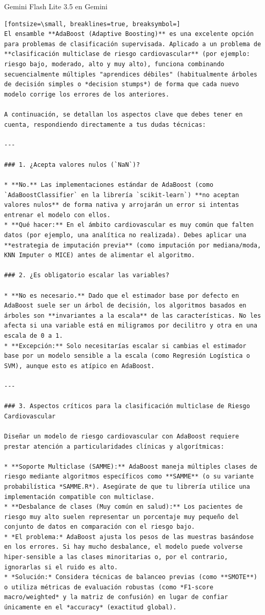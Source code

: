 \documentclass[12pt,a4paper,oneside]{book}
\begin{document}
\begin{iaresp}{Gemini Flash Lite 3.5 en Gemini}
\begin{Verbatim}[fontsize=\small, breaklines=true, breaksymbol=]
El ensamble **AdaBoost (Adaptive Boosting)** es una excelente opción para problemas de clasificación supervisada. Aplicado a un problema de **clasificación multiclase de riesgo cardiovascular** (por ejemplo: riesgo bajo, moderado, alto y muy alto), funciona combinando secuencialmente múltiples "aprendices débiles" (habitualmente árboles de decisión simples o *decision stumps*) de forma que cada nuevo modelo corrige los errores de los anteriores.

A continuación, se detallan los aspectos clave que debes tener en cuenta, respondiendo directamente a tus dudas técnicas:

---

### 1. ¿Acepta valores nulos (`NaN`)?

* **No.** Las implementaciones estándar de AdaBoost (como `AdaBoostClassifier` en la librería `scikit-learn`) **no aceptan valores nulos** de forma nativa y arrojarán un error si intentas entrenar el modelo con ellos.
* **Qué hacer:** En el ámbito cardiovascular es muy común que falten datos (por ejemplo, una analítica no realizada). Debes aplicar una **estrategia de imputación previa** (como imputación por mediana/moda, KNN Imputer o MICE) antes de alimentar el algoritmo.

### 2. ¿Es obligatorio escalar las variables?

* **No es necesario.** Dado que el estimador base por defecto en AdaBoost suele ser un árbol de decisión, los algoritmos basados en árboles son **invariantes a la escala** de las características. No les afecta si una variable está en miligramos por decilitro y otra en una escala de 0 a 1.
* **Excepción:** Solo necesitarías escalar si cambias el estimador base por un modelo sensible a la escala (como Regresión Logística o SVM), aunque esto es atípico en AdaBoost.

---

### 3. Aspectos críticos para la clasificación multiclase de Riesgo Cardiovascular

Diseñar un modelo de riesgo cardiovascular con AdaBoost requiere prestar atención a particularidades clínicas y algorítmicas:

* **Soporte Multiclase (SAMME):** AdaBoost maneja múltiples clases de riesgo mediante algoritmos específicos como **SAMME** (o su variante probabilística *SAMME.R*). Asegúrate de que tu librería utilice una implementación compatible con multiclase.
* **Desbalance de clases (Muy común en salud):** Los pacientes de riesgo muy alto suelen representar un porcentaje muy pequeño del conjunto de datos en comparación con el riesgo bajo.
* *El problema:* AdaBoost ajusta los pesos de las muestras basándose en los errores. Si hay mucho desbalance, el modelo puede volverse hiper-sensible a las clases minoritarias o, por el contrario, ignorarlas si el ruido es alto.
* *Solución:* Considera técnicas de balanceo previas (como **SMOTE**) o utiliza métricas de evaluación robustas (como *F1-score macro/weighted* y la matriz de confusión) en lugar de confiar únicamente en el *accuracy* (exactitud global).



\end{Verbatim}
\end{iaresp}
\end{document}
